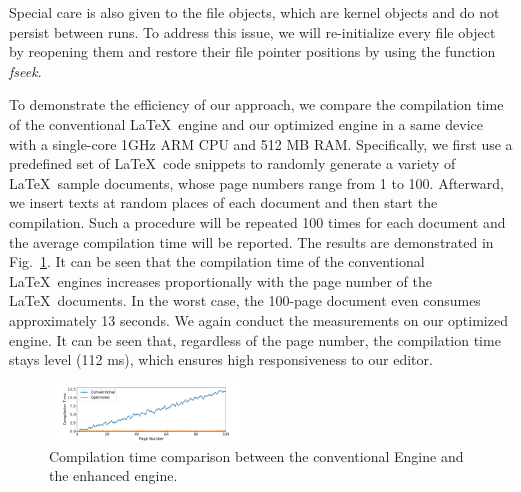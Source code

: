 \documentclass[]{sigchi}
\begin{document}

Special care is also given to the file objects, which are kernel objects and do not persist between runs. To address this issue, we will re-initialize every file object by reopening them and restore their file pointer positions by using the function \textit{fseek}.



To demonstrate the efficiency of our approach, we compare the compilation time of the conventional \LaTeX\ engine and our optimized engine in a same device with a single-core 1GHz ARM CPU and 512 MB RAM. Specifically, we first use a predefined set of \LaTeX\ code snippets to randomly generate a variety of \LaTeX\ sample documents, whose page numbers range from 1 to 100. Afterward,  
we insert texts at random places of each document and then start the compilation. Such a procedure will be repeated 100 times for each document and the average compilation time will be reported. 
The results are demonstrated in Fig.~\ref{fig:time}. It can be seen that the compilation time of the conventional \LaTeX\ engines increases proportionally with the page number of the \LaTeX\ documents. In the worst case, the 100-page document even consumes approximately 13 seconds.
We again conduct the measurements on our optimized engine. It can be seen that, regardless of the page number, the compilation time stays level (112 ms), which ensures high responsiveness to our editor. 

\begin{figure}[t]
\begin{center}
\includegraphics[width=0.45\textwidth]{figures/time}
\caption{Compilation time comparison between the conventional Engine and the enhanced engine.}
\label{fig:time}
\end{center}
\end{figure}
\end{document}
